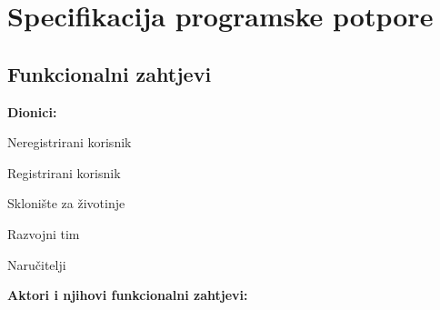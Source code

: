 \chapter{Specifikacija programske potpore}
		
	\section{Funkcionalni zahtjevi}
			

			
			\noindent \textbf{Dionici:}
			
			\begin{packed_enum}
				
				\item Neregistrirani korisnik
				\item Registrirani korisnik			
				\item Sklonište za životinje
				\item Razvojni tim
				\item Naručitelji
				
			\end{packed_enum}
			
			\noindent \textbf{Aktori i njihovi funkcionalni zahtjevi:}
			
